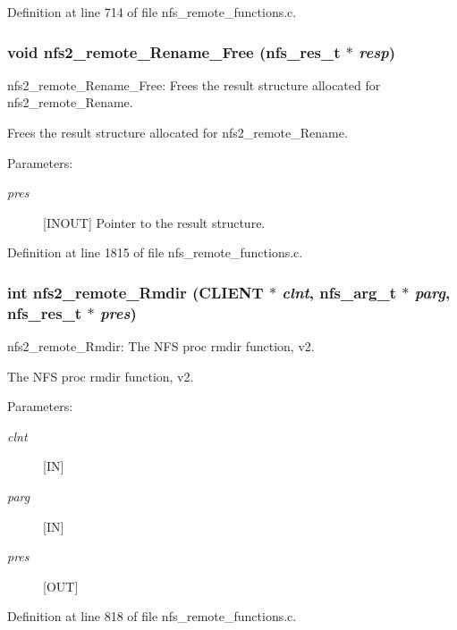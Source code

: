 Definition at line 714 of file nfs\_\-remote\_\-functions.c.
\subsubsection{\setlength{\rightskip}{0pt plus 5cm}void nfs2\_\-remote\_\-Rename\_\-Free (nfs\_\-res\_\-t $\ast$ {\em resp})}\label{group__NFSprocs_ga65}


nfs2\_\-remote\_\-Rename\_\-Free: Frees the result structure allocated for nfs2\_\-remote\_\-Rename.

Frees the result structure allocated for nfs2\_\-remote\_\-Rename.

\begin{Desc}
\item[Parameters:]
\begin{description}
\item[{\em pres}][INOUT] Pointer to the result structure. \end{description}
\end{Desc}


Definition at line 1815 of file nfs\_\-remote\_\-functions.c.
\subsubsection{\setlength{\rightskip}{0pt plus 5cm}int nfs2\_\-remote\_\-Rmdir (CLIENT $\ast$ {\em clnt}, nfs\_\-arg\_\-t $\ast$ {\em parg}, nfs\_\-res\_\-t $\ast$ {\em pres})}\label{group__NFSprocs_ga15}


nfs2\_\-remote\_\-Rmdir: The NFS proc rmdir function, v2.

The NFS proc rmdir function, v2.

\begin{Desc}
\item[Parameters:]
\begin{description}
\item[{\em clnt}][IN] \item[{\em parg}][IN] \item[{\em pres}][OUT] \end{description}
\end{Desc}


Definition at line 818 of file nfs\_\-remote\_\-functions.c.
